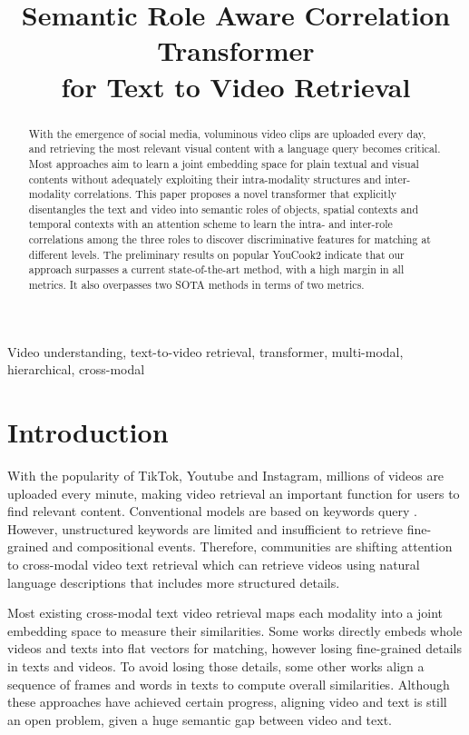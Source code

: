 \documentclass{article}
\title{Semantic Role Aware Correlation Transformer \\ for Text to Video Retrieval}
\begin{document}
\maketitle

\begin{abstract}
With the emergence of social media, voluminous video clips are uploaded every day, and retrieving the most relevant visual content with a language query becomes critical. Most approaches aim to learn a joint embedding space for plain textual and visual contents without adequately exploiting their intra-modality structures and inter-modality correlations. This paper proposes a novel transformer that explicitly disentangles the text and video into semantic roles of objects, spatial contexts and temporal contexts with an attention scheme to learn the intra- and inter-role correlations among the three roles to discover discriminative features for matching at different levels. The preliminary results on popular YouCook2 indicate that our approach surpasses a current state-of-the-art method, with a high margin in all metrics. It also overpasses two SOTA methods in terms of two metrics.  
\end{abstract}

\begin{keywords}
Video understanding,  text-to-video retrieval, transformer, multi-modal, hierarchical, cross-modal
\end{keywords}

\section{Introduction}
\label{sec:intro}
With the popularity of TikTok, Youtube and Instagram, millions of videos are uploaded every minute, making video retrieval an important function for users to find relevant content. Conventional models are based on keywords query \cite{Chang2015SemanticCD, Habibian2014CompositeCD}. However, unstructured keywords are limited and insufficient to retrieve fine-grained and compositional events. Therefore, communities are shifting attention to cross-modal video text retrieval \cite{Chen_2020_CVPR, mithun2020, miech18learning,miech19howto100m, miech20endtoend} which can retrieve videos using natural language descriptions that includes more structured details.

Most existing cross-modal text video retrieval maps each modality into a joint embedding space to measure their similarities. Some works \cite{Liu2019a, mithun2020, dong_cvpr19} directly embeds whole videos and texts into flat vectors for matching, however losing fine-grained details in texts and videos. To avoid losing those details, some other works \cite{song2019polysemous, Yu_2018_ECCV} align a sequence of frames and words in texts to compute overall
similarities. Although these approaches have achieved certain progress, aligning video and text is still an open problem, given a huge semantic gap between video and text. 
\end{document}
